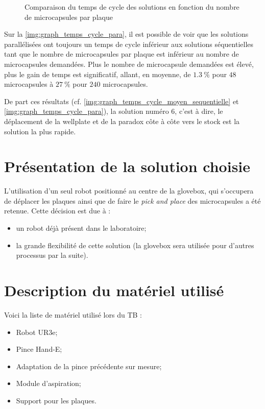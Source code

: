 \begin{figure}[H]
    \centering
    
    \caption{Comparaison du temps de cycle des solutions en fonction du nombre de \glspl{microcapsule} par plaque}
    \label{img:graph_temps_cycle_para}
\end{figure}

Sur la \autoref{img:graph_temps_cycle_para}, il est possible de voir que les solutions parallélisées ont toujours un temps de cycle inférieur aux solutions séquentielles tant que le nombre de \glspl{microcapsule} par plaque est inférieur au nombre de microcapsules demandées.
Plus le nombre de \gls{microcapsule} demandées est élevé, plus le gain de temps est significatif, allant, en moyenne, de $1.3~\%$ pour $48$ \glspl{microcapsule} à $27~\%$ pour $240$ \glspl{microcapsule}.

De part ces résultats (cf. \autoref{img:graph_temps_cycle_moyen_sequentielle} et \autoref{img:graph_temps_cycle_para}), la solution numéro $6$, c'est à dire, le déplacement de la \gls{wellplate} et de la \gls{paradox} côte à côte vers le stock est la solution la plus rapide.
\section{Présentation de la solution choisie}
L'utilisation d'un seul robot positionné au centre de la \gls{glovebox}, qui s'occupera de déplacer les plaques ainsi que de faire le \textit{pick and place} des \glspl{microcapsule} a été retenue.
Cette décision est due à : 
\begin{itemize}
    \item un robot déjà présent dans le laboratoire;
    \item la grande flexibilité de cette solution (la \gls{glovebox} sera utilisée pour d'autres processus par la suite).
\end{itemize}
\section{Description du matériel utilisé}
Voici la liste de matériel utilisé lors du TB : 
\begin{itemize}
    \item Robot \og{}UR3e\fg{};
    \item Pince \og{}Hand-E\fg{};
    \item Adaptation de la pince précédente sur mesure;
    \item Module d'aspiration;
    \item Support pour les plaques.
\end{itemize}
